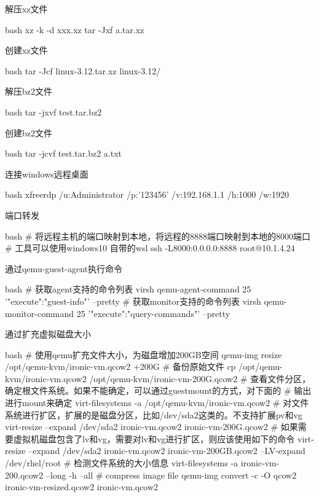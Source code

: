 \begin{outline}[enumerate]
\1 解压xz文件
\begin{code-in-enumerate}{bash}
xz -k -d xxx.xz
tar -Jxf a.tar.xz
\end{code-in-enumerate}

\1 创建xz文件
\begin{code-in-enumerate}{bash}
tar -Jcf linux-3.12.tar.xz linux-3.12/
\end{code-in-enumerate}

\1 解压bz2文件
\begin{code-in-enumerate}{bash}
tar -jxvf test.tar.bz2
\end{code-in-enumerate}

\1 创建bz2文件
\begin{code-in-enumerate}{bash}
tar -jcvf test.tar.bz2 a.txt
\end{code-in-enumerate}

\1 连接windows远程桌面
\begin{code-in-enumerate}{bash}
xfreerdp /u:Administrator /p:'123456' /v:192.168.1.1  /h:1000 /w:1920
\end{code-in-enumerate}

\1 端口转发
\begin{code-in-enumerate}{bash}
# 将远程主机的端口映射到本地，将远程的8888端口映射到本地的8000端口
# 工具可以使用windows10 自带的wsl
ssh -L8000:0.0.0.0:8888 root@10.1.4.24
\end{code-in-enumerate}

\1 通过qemu-guest-agent执行命令
\begin{code-in-enumerate}{bash}
# 获取agent支持的命令列表
virsh qemu-agent-command 25 '{"execute":"guest-info"}' --pretty
# 获取monitor支持的命令列表
virsh qemu-monitor-command 25 '{"execute":"query-commands"}' --pretty
\end{code-in-enumerate}

\1 通过扩充虚拟磁盘大小
\begin{code-in-enumerate}{bash}
# 使用qemu扩充文件大小，为磁盘增加200GB空间
qemu-img resize /opt/qemu-kvm/ironic-vm.qcow2 +200G
# 备份原始文件
cp /opt/qemu-kvm/ironic-vm.qcow2 /opt/qemu-kvm/ironic-vm-200G.qcow2
# 查看文件分区，确定根文件系统。如果不能确定，可以通过guestmount的方式，对下面的
# 输出进行mount来确定
virt-filesystems -a /opt/qemu-kvm/ironic-vm.qcow2
# 对文件系统进行扩区，扩展的是磁盘分区，比如/dev/sda2这类的。不支持扩展pv和vg
virt-resize --expand /dev/sda2 ironic-vm.qcow2 ironic-vm-200G.qcow2
# 如果需要虚拟机磁盘包含了lv和vg，需要对lv和vg进行扩区，则应该使用如下的命令
virt-resize --expand /dev/sda2 ironic-vm.qcow2 ironic-vm-200GB.qcow2 --LV-expand /dev/rhel/root
# 检测文件系统的大小信息
virt-filesystems -a ironic-vm-200.qcow2 --long -h --all
# compress image file
qemu-img convert -c -O qcow2 ironic-vm-resized.qcow2 ironic-vm.qcow2


\end{code-in-enumerate}
\end{outline}
